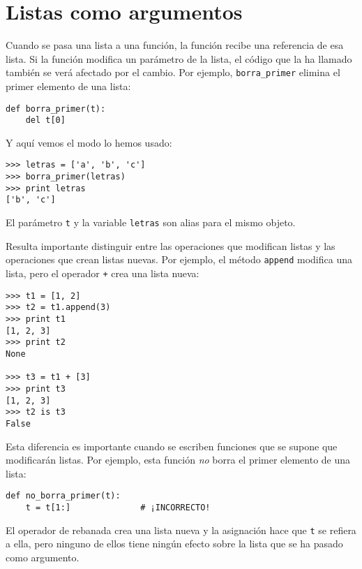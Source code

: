 \section{Listas como argumentos}


Cuando se pasa una lista a una función, la función recibe una referencia
de esa lista.
Si la función modifica un parámetro de la lista, el código que la ha llamado también se verá afectado por el cambio.
Por ejemplo, \verb"borra_primer" elimina el primer elemento de una lista:

\beforeverb
\begin{verbatim}
def borra_primer(t):
    del t[0]
\end{verbatim}
\afterverb
%
Y aquí vemos el modo lo hemos usado:

\beforeverb
\begin{verbatim}
>>> letras = ['a', 'b', 'c']
>>> borra_primer(letras)
>>> print letras
['b', 'c']
\end{verbatim}
\afterverb
%
El parámetro {\tt t} y la variable {\tt letras} son
alias para el mismo objeto.

Resulta importante distinguir entre las operaciones que
modifican listas y las operaciones que crean listas nuevas.
Por ejemplo, el método {\tt append} modifica una lista, pero el
operador {\tt +} crea una lista nueva:


\beforeverb
\begin{verbatim}
>>> t1 = [1, 2]
>>> t2 = t1.append(3)
>>> print t1
[1, 2, 3]
>>> print t2
None

>>> t3 = t1 + [3]
>>> print t3
[1, 2, 3]
>>> t2 is t3
False
\end{verbatim}
\afterverb

Esta diferencia es importante cuando se escriben funciones que
se supone que modificarán listas. Por ejemplo, esta función
\emph{no} borra el primer elemento de una lista:

\beforeverb
\begin{verbatim}
def no_borra_primer(t):
    t = t[1:]              # ¡INCORRECTO!
\end{verbatim}
\afterverb

El operador de rebanada crea una lista nueva y la asignación
hace que {\tt t} se refiera a ella, pero ninguno de ellos tiene ningún efecto
sobre la lista que se ha pasado como argumento.

